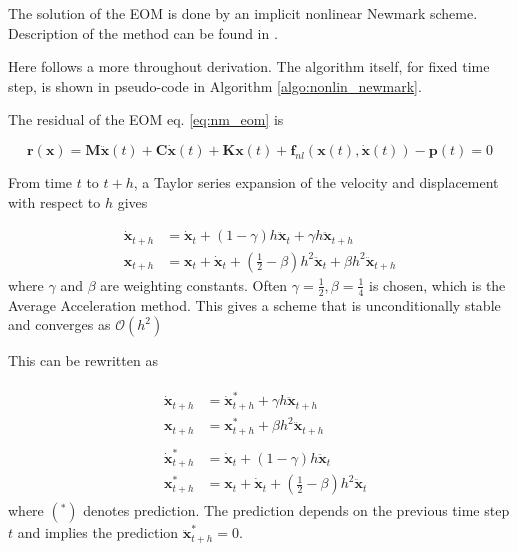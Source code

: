 The solution of the EOM is done by an implicit nonlinear Newmark scheme.
Description of the method can be found in \textcite{krenk2009non}.

Here follows a more throughout derivation. The algorithm itself, for fixed time
step, is shown in pseudo-code in Algorithm \ref{algo:nonlin_newmark}.


The residual of the EOM eq. \eqref{eq:nm_eom} is

\begin{equation}
  \label{eq:nm_res}
  \bm r (\bm x) = \bm M \ddot{\bm x}(t) + \bm C \dot{\bm x}(t) + \bm K \bm x(t) +
    \bm f_{nl} \left( \bm x(t), \dot{ \bm x}(t) \right) - \bm p(t) = 0
\end{equation}

From time $t$ to $t+h$, a Taylor series expansion of the velocity and
displacement with respect to $h$ gives

\begin{equation}
  \label{eq:nm_taylor}
  \begin{aligned}
    \dot {\bm x}_{t+h} &= \dot{\bm x}_t + (1-\gamma)h \ddot{\bm x}_t + \gamma h \ddot{\bm x}_{t+h} \\
    {\bm x}_{t+h} &= \bm x_t + \dot{\bm x}_t + (\frac{1}{2}-\beta)h^2 \ddot{\bm x}_t + \beta h^2 \ddot{\bm x}_{t+h}
  \end{aligned}
\end{equation}
where $\gamma$ and $\beta$ are weighting constants. Often $\gamma =\frac{1}{2},
\beta = \frac{1}{4}$ is chosen, which is the Average Acceleration method. This
gives a scheme that is unconditionally stable and converges as
$\mathcal{O}(h^2)$

This can be rewritten as

\begin{align}
  \label{eq:nm_taylor2}
  &\begin{aligned}
    \dot {\bm x}_{t+h} &= \dot{\bm x}^*_{t+h} + \gamma h \ddot{\bm x}_{t+h} \\
    \bm x_{t+h} &= \bm x^*_{t+h} + \beta h^2 \ddot{\bm x}_{t+h}
  \end{aligned} \\
  &\begin{aligned}
    \dot {\bm x}^*_{t+h} &= \dot{\bm x}_t + (1-\gamma)h \ddot{\bm x}_t  \\
    {\bm x}^*_{t+h} &= \bm x_t + \dot{\bm x}_t + (\frac{1}{2}-\beta)h^2 \ddot{\bm x}_t
  \end{aligned}
\end{align}
where $(^*)$ denotes prediction. The prediction depends on the previous time
step $t$ and implies the prediction $\ddot{\bm x}^*_{t+h} = 0$.

